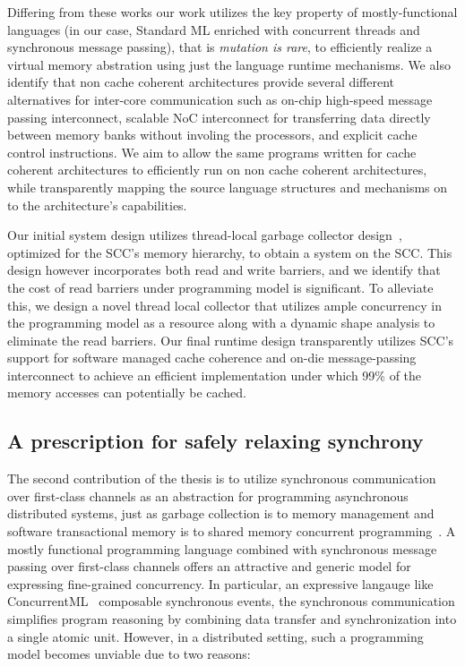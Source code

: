 Differing from these works our work utilizes the key property of
mostly-functional languages (in our case, Standard ML enriched with concurrent
threads and synchronous message passing), that is \emph{mutation is rare}, to
efficiently realize a virtual memory abstration using just the language runtime
mechanisms. We also identify that non cache coherent architectures provide
several different alternatives for inter-core communication such as on-chip
high-speed message passing interconnect, scalable NoC interconnect for
transferring data directly between memory banks without involing the
processors, and explicit cache control instructions. We aim to allow the same
programs written for cache coherent architectures to efficiently run on non
cache coherent architectures, while transparently mapping the source language
structures and mechanisms on to the architecture's capabilities.

Our initial system design utilizes thread-local garbage collector
design~\cite{}, optimized for the SCC's memory hierarchy, to obtain a \MM
system on the SCC. This design however incorporates both read and write
barriers, and we identify that the cost of read barriers under \MM programming
model is significant. To alleviate this, we design a novel thread local
collector that utilizes ample concurrency in the programming model as a
resource along with a dynamic shape analysis to eliminate the read barriers.
Our final runtime design transparently utilizes SCC's support for software
managed cache coherence and on-die message-passing interconnect to achieve an
efficient implementation under which 99\% of the memory accesses can
potentially be cached.

\subsection{A prescription for safely relaxing synchrony}

The second contribution of the thesis is to utilize synchronous communication
over first-class channels as an abstraction for programming asynchronous
distributed systems, just as garbage collection is to memory management and
software transactional memory is to shared memory concurrent
programming~\cite{Grossman2007}. A mostly functional programming language combined
with synchronous message passing over first-class channels offers an attractive
and generic model for expressing fine-grained concurrency. In particular, an
expressive langauge like ConcurrentML~\cite{Reppy99} composable synchronous
events, the synchronous communication simplifies program reasoning by combining
data transfer and synchronization into a single atomic unit. However, in a
distributed setting, such a programming model becomes unviable due to two
reasons:

